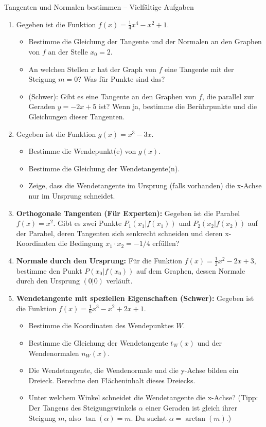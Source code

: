 \begin{aufgabenumgebung}{Tangenten und Normalen bestimmen – Vielfältige Aufgaben}
\begin{enumerate}
    \item Gegeben ist die Funktion $f(x) = \frac{1}{4}x^4 - x^2 + 1$.
        \begin{itemize}
            \item Bestimme die Gleichung der Tangente und der Normalen an den Graphen von $f$ an der Stelle $x_0 = 2$.
            \item An welchen Stellen $x$ hat der Graph von $f$ eine Tangente mit der Steigung $m=0$? Was für Punkte sind das?
            \item (Schwer): Gibt es eine Tangente an den Graphen von $f$, die parallel zur Geraden $y = -2x+5$ ist? Wenn ja, bestimme die Berührpunkte und die Gleichungen dieser Tangenten.
        \end{itemize}
    \item Gegeben ist die Funktion $g(x) = x^3 - 3x$.
        \begin{itemize}
            \item Bestimme die Wendepunkt(e) von $g(x)$.
            \item Bestimme die Gleichung der Wendetangente(n).
            \item Zeige, dass die Wendetangente im Ursprung (falls vorhanden) die x-Achse nur im Ursprung schneidet.
        \end{itemize}
    \item \textbf{Orthogonale Tangenten (Für Experten):}
        Gegeben ist die Parabel $f(x) = x^2$. Gibt es zwei Punkte $P_1(x_1|f(x_1))$ und $P_2(x_2|f(x_2))$ auf der Parabel, deren Tangenten sich senkrecht schneiden und deren x-Koordinaten die Bedingung $x_1 \cdot x_2 = -1/4$ erfüllen?

    \item \textbf{Normale durch den Ursprung:}
        Für die Funktion $f(x) = \frac{1}{2}x^2 - 2x + 3$, bestimme den Punkt $P(x_0|f(x_0))$ auf dem Graphen, dessen Normale durch den Ursprung $(0|0)$ verläuft.

    \item \textbf{Wendetangente mit speziellen Eigenschaften (Schwer):}
        Gegeben ist die Funktion $f(x) = \frac{1}{6}x^3 - x^2 + 2x + 1$.
        \begin{itemize}
            \item Bestimme die Koordinaten des Wendepunktes $W$.
            \item Bestimme die Gleichung der Wendetangente $t_W(x)$ und der Wendenormalen $n_W(x)$.
            \item Die Wendetangente, die Wendenormale und die y-Achse bilden ein Dreieck. Berechne den Flächeninhalt dieses Dreiecks.
            \item Unter welchem Winkel schneidet die Wendetangente die x-Achse? (Tipp: Der Tangens des Steigungswinkels $\alpha$ einer Geraden ist gleich ihrer Steigung $m$, also $\tan(\alpha) = m$. Du suchst $\alpha = \arctan(m)$.)
        \end{itemize}


\end{enumerate}
\end{aufgabenumgebung}
